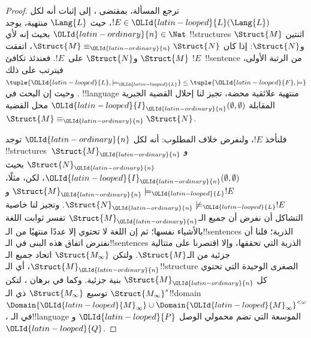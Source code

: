 \documentclass[../../../include/open-logic-section]{subfiles}
\begin{document}
\begin{proof}
ترجع المسألة، بمقتضى ، إلى إثبات أنه لكل
$!E \in {\OLId{latin-looped}{L}}(\Lang{L})$، حيث $\Lang{L}$ منتهية، يوجد ${\OLId{latin-ordinary}{n}} \in \Nat$ بحيث
إنه لأي !!{structure}s اثنتين $\Struct{M}$ و$\Struct{N}$: إذا كان
$\Struct{M} \equiv_{\OLId{latin-ordinary}{n}} \Struct{N}$، اتفقت $\Struct{M}$ و$\Struct{N}$
على~$!E$. فعندئذ تكافئ $!E$~!!{sentence} من الرتبة الأولى، فيترتب على ذلك
$\tuple{{\OLId{latin-looped}{L}},\models_{\OLId{latin-looped}{L}}} \le \tuple{{\OLId{latin-looped}{F}},\models}$. وحيث إن البحث في
!!{language} منتهية علائقية محضة، تجيز لنا
 إحلال القضية الجبرية المقابلة
${\OLId{latin-looped}{I}}_{\OLId{latin-ordinary}{n}}(\emptyset,\emptyset)$ محل القضية
$\Struct{M} \equiv_{\OLId{latin-ordinary}{n}} \Struct{N}$.

فلنأخذ $!E$، ولنفرض خلاف المطلوب: أنه لكل ${\OLId{latin-ordinary}{n}}$ توجد
!!{structure}s~$\Struct{M}_{\OLId{latin-ordinary}{n}}$ و$\Struct{N}_{\OLId{latin-ordinary}{n}}$ بحيث
${\OLId{latin-looped}{I}}_{\OLId{latin-ordinary}{n}}(\emptyset,\emptyset)$، لكن، مثلًا،
$\Struct{M}_{\OLId{latin-ordinary}{n}} \models_{\OLId{latin-looped}{L}} !E$ و$\Struct{N}_{\OLId{latin-ordinary}{n}} \not\models_{\OLId{latin-looped}{L}} !E$. وتجيز لنا خاصية
التشاكل أن نفرض أن جميع الـ$\Struct{M}_{\OLId{latin-ordinary}{n}}$ تفسر ثوابت اللغة
بالأشياء نفسها؛ ثم إن اللغة لا تحتوي إلا عددًا منتهيًا من
الـ!!{sentence}s الذرية؛ فلنا أن نفترض اتفاق هذه البنى في الـ!!{sentence}s الذرية
التي تحققها، وإلا اقتصرنا على متتالية جزئية من الـ$\Struct{M}$. ولتكن
$\Struct{M_\infty}$ اتحاد جميع الـ$\Struct{M}_{\OLId{latin-ordinary}{n}}$، أي الـ!!{structure}
الصغرى الوحيدة التي تحتوي كل $\Struct{M}_{\OLId{latin-ordinary}{n}}$ بنية جزئية. وكما في برهان
، لتكن $\Struct{M_\infty}^*$ توسيع
$\Struct{M_\infty}$ ذي الـ!!{domain}
$\Domain{{\OLId{latin-looped}{M}}_\infty} \cup \Domain{{\OLId{latin-looped}{M}}_\infty}^{<\omega}$، في
الـ!!{language} الموسعة التي تضم محمولي الوصل ${\OLId{latin-looped}{P}}$ و${\OLId{latin-looped}{Q}}$.


\end{proof}
\end{document}
